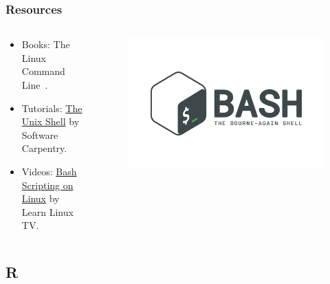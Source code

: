 \documentclass[aspectratio=169]{beamer}
\begin{document}
\begin{frame}
    \frametitle{Resources}
    \begin{columns}
        \begin{column}{0.5\textwidth}
            \begin{itemize}
                \item Books: The Linux Command Line~\cite{shotts2019}.
                \item Tutorials: \href{https://swcarpentry.github.io/shell-novice/}
                    {The Unix Shell} by Software Carpentry.
                \item Videos: 
                    \href{https://www.youtube.com/watch?v=2733cRPudvI&list=PLT98CRl2KxKGj-VKtApD8-zCqSaN2mD4w}
                    {Bash Scripting on Linux} by Learn Linux TV.
            \end{itemize}
        \end{column}
        \begin{column}{0.5\textwidth}
            \begin{figure}
                \centering
                \includegraphics[scale=0.05]{logos/bash.png}
            \end{figure}
        \end{column}
    \end{columns}

\end{frame}



\subsection{R}
\end{document}
